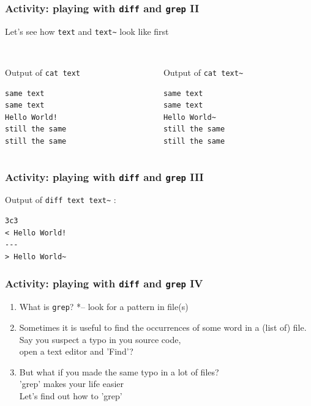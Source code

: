\begin{frame}[fragile]
\frametitle{Activity: playing with \texttt{diff} and \texttt{grep} II}
Let's see how \texttt{text} and \texttt{text\~} look like first

\begin{columns}
\begin{column}{0.5\textwidth}
\\ Output of \texttt{cat text}

\begin{verbatim}
same text
same text
Hello World!
still the same
still the same
\end{verbatim}
\end{column}

\begin{column}{0.5\textwidth}
\\ Output of \texttt{cat text\~}
\begin{verbatim}
same text
same text
Hello World~
still the same
still the same
\end{verbatim}
\end{column}
\end{columns}
\end{frame}


\begin{frame}[fragile]
\frametitle{Activity: playing with \texttt{diff} and \texttt{grep} III}
Output of \texttt{diff text text\~} :
\begin{verbatim}
3c3
< Hello World!
---
> Hello World~
\end{verbatim}
\end{frame}




\begin{frame}
\frametitle{Activity: playing with \texttt{diff} and \texttt{grep} IV}
\begin{enumerate}
\item What is \texttt{grep}? *-- look for a pattern in file(s)
\item Sometimes it is useful to find the occurrences of some word in a (list of) file.\\ 
Say you suspect a typo in you source code,\\ 
open a text editor and 'Find'?
\item But what if you made the same typo in a lot of files?\\
'grep' makes your life easier\\
Let's find out how to 'grep'
\end{enumerate}
\end{frame}


